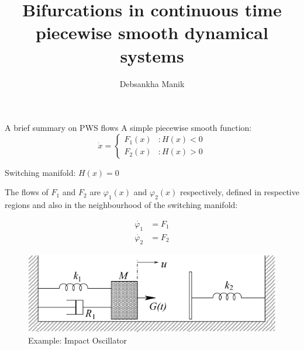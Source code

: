 \documentclass[xcolor=x11names,compress]{beamer}
\renewcommand{\(}{\begin{columns}}
\renewcommand{\)}{\end{columns}}
\newcommand{\<}[1]{\begin{column}{#1}}
\renewcommand{\>}{\end{column}}
\begin{document}
\title{Bifurcations in continuous time piecewise smooth dynamical systems}
\author{Debsankha Manik}

\begin{frame}
\titlepage
\end{frame}

\begin{frame}{A brief summary on PWS flows}
A simple piecewise smooth function:
\begin{displaymath}
   \dot{x} = \left\{
     \begin{array}{lr}
       F_1(x) & : H(x) < 0\\
       F_2(x) & : H(x) >0
     \end{array}
   \right.
\end{displaymath}

Switching manifold: $H(x)=0$

The flows of $F_1$ and $F_2$ are $\varphi_1(x)$ and $\varphi_2(x)$ 
respectively, defined in respective regions and also in the neighbourhood of 
the switching manifold:

\begin{align}
\dot{\varphi_1}&=F_1\\
\dot{\varphi_2}&=F_2
\end{align}
 
\end{frame}

\begin{frame}
\begin{figure}
\caption{Example: Impact Oscillator}
\begin{center}
\includegraphics[width=0.9\columnwidth]{../2011-11-20/osc-pw}
\end{center}
\end{figure}

\end{frame}
\end{document}
